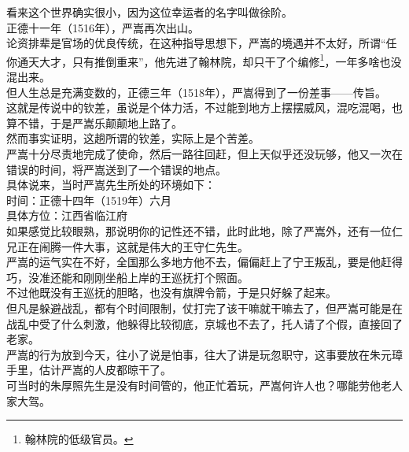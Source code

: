 \begin{multicols}{\theparacolNo}
看来这个世界确实很小，因为这位幸运者的名字叫做徐阶。\\

正德十一年（1516年），严嵩再次出山。\\

论资排辈是官场的优良传统，在这种指导思想下，严嵩的境遇并不太好，所谓“任你通天大才，只有推倒重来”，他先进了翰林院，却只干了个编修\footnote{翰林院的低级官员。}，一年多啥也没混出来。\\

但人生总是充满变数的，正德三年（1518年），严嵩得到了一份差事——传旨。\\

这就是传说中的钦差，虽说是个体力活，不过能到地方上摆摆威风，混吃混喝，也算不错，于是严嵩乐颠颠地上路了。\\

然而事实证明，这趟所谓的钦差，实际上是个苦差。\\

严嵩十分尽责地完成了使命，然后一路往回赶，但上天似乎还没玩够，他又一次在错误的时间，将严嵩送到了一个错误的地点。\\

具体说来，当时严嵩先生所处的环境如下：\\

时间：正德十四年（1519年）六月\\

具体方位：江西省临江府\\

如果感觉比较眼熟，那说明你的记性还不错，此时此地，除了严嵩外，还有一位仁兄正在闹腾一件大事，这就是伟大的王守仁先生。\\

严嵩的运气实在不好，全国那么多地方他不去，偏偏赶上了宁王叛乱，要是他赶得巧，没准还能和刚刚坐船上岸的王巡抚打个照面。\\

不过他既没有王巡抚的胆略，也没有旗牌令箭，于是只好躲了起来。\\

但凡是躲避战乱，都有个时间限制，仗打完了该干嘛就干嘛去了，但严嵩可能是在战乱中受了什么刺激，他躲得比较彻底，京城也不去了，托人请了个假，直接回了老家。\\

严嵩的行为放到今天，往小了说是怕事，往大了讲是玩忽职守，这事要放在朱元璋手里，估计严嵩的人皮都晾干了。\\

可当时的朱厚照先生是没有时间管的，他正忙着玩，严嵩何许人也？哪能劳他老人家大驾。\\


\end{multicols}
